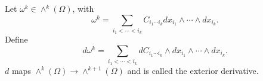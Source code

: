 
Let $\omega^k \in \wedge^k(\Omega)$, with
$$\omega^k = \sum_{i_1 < \cdots < i_k} C_{i_1 \cdots i_k} dx_{i_1} \wedge \cdots \wedge dx_{i_k}.$$
Define
$$d\omega^k = \sum_{i_1 < \cdots < i_k} dC_{i_1 \cdots i_k} \wedge dx_{i_1} \wedge \cdots \wedge dx_{i_k}.$$
$d$ maps $\wedge^k(\Omega) \rightarrow \wedge^{k+1}(\Omega)$ and is called the exterior derivative.

